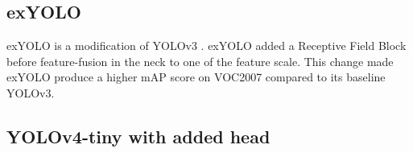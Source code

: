   \subsection{exYOLO}
  exYOLO is a modification of YOLOv3 \parencite{exyolo}.
  exYOLO added a Receptive Field Block before feature-fusion in the neck to one of the feature scale.
  This change made exYOLO produce a higher mAP score on VOC2007 compared to its baseline YOLOv3.

  \subsection{YOLOv4-tiny with added head}%
